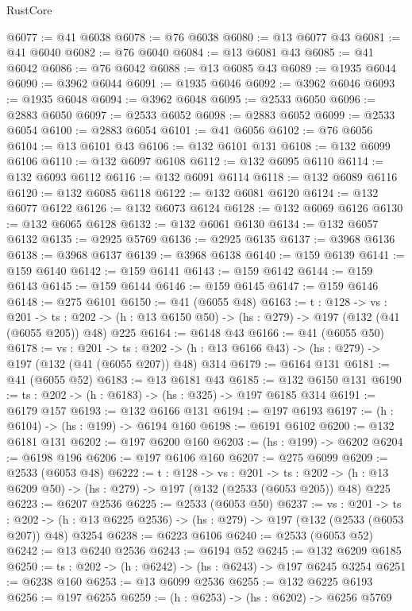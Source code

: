 \begin{lexlean}{RustCore}
\begin{coremodule}
@6077 := @41 @6038
@6078 := @76 @6038
@6080 := @13 @6077 @43
@6081 := @41 @6040
@6082 := @76 @6040
@6084 := @13 @6081 @43
@6085 := @41 @6042
@6086 := @76 @6042
@6088 := @13 @6085 @43
@6089 := @1935 @6044
@6090 := @3962 @6044
@6091 := @1935 @6046
@6092 := @3962 @6046
@6093 := @1935 @6048
@6094 := @3962 @6048
@6095 := @2533 @6050
@6096 := @2883 @6050
@6097 := @2533 @6052
@6098 := @2883 @6052
@6099 := @2533 @6054
@6100 := @2883 @6054
@6101 := @41 @6056
@6102 := @76 @6056
@6104 := @13 @6101 @43
@6106 := @132 @6101 @131
@6108 := @132 @6099 @6106
@6110 := @132 @6097 @6108
@6112 := @132 @6095 @6110
@6114 := @132 @6093 @6112
@6116 := @132 @6091 @6114
@6118 := @132 @6089 @6116
@6120 := @132 @6085 @6118
@6122 := @132 @6081 @6120
@6124 := @132 @6077 @6122
@6126 := @132 @6073 @6124
@6128 := @132 @6069 @6126
@6130 := @132 @6065 @6128
@6132 := @132 @6061 @6130
@6134 := @132 @6057 @6132
@6135 := @2925 @5769
@6136 := @2925 @6135
@6137 := @3968 @6136
@6138 := @3968 @6137
@6139 := @3968 @6138
@6140 := @159 @6139
@6141 := @159 @6140
@6142 := @159 @6141
@6143 := @159 @6142
@6144 := @159 @6143
@6145 := @159 @6144
@6146 := @159 @6145
@6147 := @159 @6146
@6148 := @275 @6101
@6150 := @41 (@6055 @48)
@6163 := {t : @128} ->
  {vs : @201} ->
  {ts : @202} -> (h : @13 @6150 @50) -> (hs : @279) -> @197 (@132 (@41 (@6055 @205)) @48) @225
@6164 := @6148 @43
@6166 := @41 (@6055 @50)
@6178 := {vs : @201} ->
  {ts : @202} -> (h : @13 @6166 @43) -> (hs : @279) -> @197 (@132 (@41 (@6055 @207)) @48) @314
@6179 := @6164 @131
@6181 := @41 (@6055 @52)
@6183 := @13 @6181 @43
@6185 := @132 @6150 @131
@6190 := {ts : @202} -> (h : @6183) -> (hs : @325) -> @197 @6185 @314
@6191 := @6179 @157
@6193 := @132 @6166 @131
@6194 := @197 @6193
@6197 := (h : @6104) -> (hs : @199) -> @6194 @160
@6198 := @6191 @6102
@6200 := @132 @6181 @131
@6202 := @197 @6200 @160
@6203 := (hs : @199) -> @6202
@6204 := @6198 @196
@6206 := @197 @6106 @160
@6207 := @275 @6099
@6209 := @2533 (@6053 @48)
@6222 := {t : @128} ->
  {vs : @201} ->
  {ts : @202} -> (h : @13 @6209 @50) -> (hs : @279) -> @197 (@132 (@2533 (@6053 @205)) @48) @225
@6223 := @6207 @2536
@6225 := @2533 (@6053 @50)
@6237 := {vs : @201} ->
  {ts : @202} -> (h : @13 @6225 @2536) -> (hs : @279) -> @197 (@132 (@2533 (@6053 @207)) @48) @3254
@6238 := @6223 @6106
@6240 := @2533 (@6053 @52)
@6242 := @13 @6240 @2536
@6243 := @6194 @52
@6245 := @132 @6209 @6185
@6250 := {ts : @202} -> (h : @6242) -> (hs : @6243) -> @197 @6245 @3254
@6251 := @6238 @160
@6253 := @13 @6099 @2536
@6255 := @132 @6225 @6193
@6256 := @197 @6255
@6259 := (h : @6253) -> (hs : @6202) -> @6256 @5769

\end{coremodule}
\end{lexlean}

